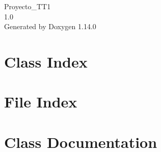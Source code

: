 \documentclass[twoside]{book}
\newcommand{\+}{\discretionary{\mbox{\scriptsize$\hookleftarrow$}}{}{}}
\newcommand{\clearemptydoublepage}{%
    \newpage{\pagestyle{empty}\cleardoublepage}%
  }
\begin{document}
  \raggedbottom
    \hypersetup{pageanchor=false,
                bookmarksnumbered=true,
                pdfencoding=unicode
               }
  \begin{titlepage}
  \vspace*{7cm}
  \begin{center}%
  {\Large Proyecto\+\_\+\+TT1}\\
  [1ex]\large 1.\+0 \\
  \vspace*{1cm}
  {\large Generated by Doxygen 1.14.0}\\
  \end{center}
  \end{titlepage}
  \clearemptydoublepage
  \tableofcontents
  \clearemptydoublepage
  \hypersetup{pageanchor=true}

\chapter{Class Index}

\chapter{File Index}

\chapter{Class Documentation}



\end{document}
